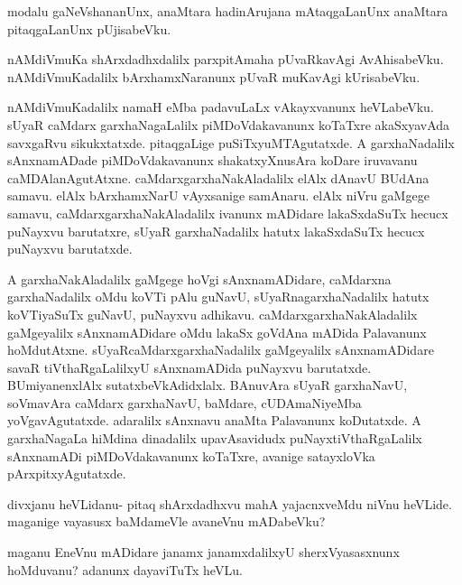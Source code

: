 \documentclass{article}
\begin{document}
\begin{mng}%
modalu gaNeVshananUnx, anaMtara hadinArujana mAtaqgaLanUnx
anaMtara pitaqgaLanUnx pUjisabeVku.
\end{mng}

\begin{mng}%
nAMdiVmuKa shArxdadhxdalilx parxpitAmaha pUvaRkavAgi AvAhisabeVku.
nAMdiVmuKadalilx bArxhamxNaranunx pUvaR muKavAgi kUrisabeVku.
\end{mng}

\begin{mng}%
nAMdiVmuKadalilx namaH eMba padavuLaLx vAkayxvanunx
heVLabeVku. sUyaR caMdarx garxhaNagaLalilx piMDoVdakavanunx koTaTxre
akaSxyavAda savxgaRvu sikukxtatxde. pitaqgaLige puSiTxyuMTAgutatxde. A garxhaNadalilx
sAnxnamADade piMDoVdakavanunx shakatxyXnusAra koDare iruvavanu caMDAlanAgutAtxne.
caMdarxgarxhaNakAladalilx elAlx dAnavU BUdAna samavu. elAlx
bArxhamxNarU vAyxsanige samAnaru. elAlx niVru gaMgege samavu, 
caMdarxgarxhaNakAladalilx ivanunx mADidare lakaSxdaSuTx hecucx puNayxvu barutatxre, sUyaR
garxhaNadalilx hatutx lakaSxdaSuTx hecucx puNayxvu barutatxde.
\end{mng}

\begin{mng}%
A garxhaNakAladalilx gaMgege hoVgi sAnxnamADidare,
caMdarxna garxhaNadalilx oMdu koVTi pAlu guNavU, sUyaRnagarxhaNadalilx
hatutx koVTiyaSuTx guNavU, puNayxvu adhikavu. caMdarxgarxhaNakAladalilx gaMgeyalilx
sAnxnamADidare oMdu lakaSx goVdAna mADida Palavanunx hoMdutAtxne.
sUyaRcaMdarxgarxhaNadalilx gaMgeyalilx sAnxnamADidare savaR tiVthaRgaLalilxyU
sAnxnamADida puNayxvu barutatxde. BUmiyanenxlAlx sutatxbeVkAdidxlalx. 
BAnuvAra sUyaR garxhaNavU, soVmavAra caMdarx garxhaNavU, baMdare,
cUDAmaNiyeMba yoVgavAgutatxde. adaralilx sAnxnavu anaMta Palavanunx
koDutatxde. A garxhaNagaLa hiMdina dinadalilx upavAsavidudx puNayxtiVthaRgaLalilx
sAnxnamADi piMDoVdakavanunx koTaTxre, avanige satayxloVka pArxpitxyAgutatxde.
\end{mng}

\begin{mng}%
divxjanu heVLidanu- pitaq shArxdadhxvu mahA yajacnxveMdu niVnu
heVLide. maganige vayasusx baMdameVle avaneVnu mADabeVku?
\end{mng}

\begin{mng}%
maganu EneVnu mADidare janamx janamxdalilxyU sherxVyasasxnunx
hoMduvanu? adanunx dayaviTuTx heVLu.
\end{mng}
\end{document}
